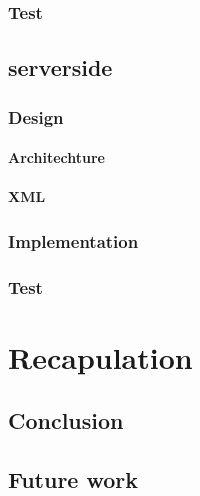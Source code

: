      \subsection{Test}

  \section{serverside} %
    \subsection{Design}
      \subsubsection{Architechture}
      \subsubsection{XML}
    \subsection{Implementation}
    \subsection{Test}

\chapter{Recapulation}
  \section{Conclusion}
  \section{Future work}

\appendix


